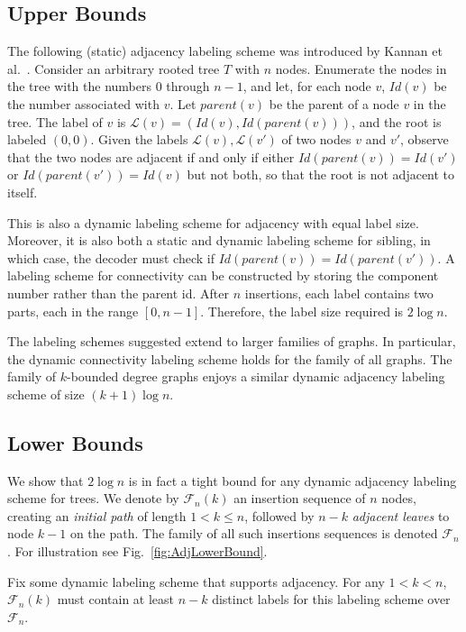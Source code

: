 \documentclass{llncs}
\newcommand{\la}{\ensuremath{ \mathcal{L}}}
\newcommand{\drop}[1]{}
\begin{document}
\subsection{ Upper Bounds} \label{sec:upper-bounds-dynamic}
The following (static) adjacency labeling scheme was introduced by Kannan et al.~\cite{Kannan92}.
Consider an arbitrary rooted tree $T$ with $n$ nodes.
Enumerate the nodes in the tree with the numbers $0$ through $n-1$, and let,
for each node $v$, $Id(v)$ be the number associated with $v$. Let $parent(v)$ be the parent of a node $v$ in the tree.
The label of $v$ is $\la(v) = (Id(v),Id(parent(v)))$, and the root is labeled
$(0,0)$. Given the labels $\la(v),\la(v')$ of two nodes $v$ and $v'$, observe
that the two nodes are adjacent if and only if either $Id(parent(v))=Id(v')$ or
$Id(parent(v'))=Id(v)$ but not both, so that the root is not adjacent to
itself.

This is also  a dynamic labeling scheme for adjacency with equal label size.
 Moreover, it is also both a static and dynamic labeling scheme for sibling,
in which case, the decoder must check if $Id(parent(v))= Id(parent(v'))$.
 A labeling scheme for connectivity can be constructed by storing the
 component number rather than the parent id. After $n$ insertions, each label contains two parts, each in the range
 $[0,n-1]$.  Therefore, the label size required is $2 \log n$.

The labeling schemes suggested extend to larger families of graphs.
In particular, the dynamic connectivity labeling scheme  holds  for the family of all graphs.
The family of $k$-bounded degree graphs enjoys a similar dynamic adjacency labeling scheme of size $(k+1) \log n$.



\subsection{ Lower Bounds}
We  show that $2 \log n$ is in fact a tight bound for any dynamic adjacency labeling scheme for trees.
We denote  by $\mathcal{F}_n(k)$ an  insertion sequence   of  $n$ nodes, creating  an \emph{initial  path} of length $1 < k \leq n $, followed by  $n-k$  \emph{adjacent leaves}  to node $k-1$ on the path.
The family of all such insertions sequences is denoted $\mathcal{F}_n$. For illustration see Fig.~\ref{fig:AdjLowerBound}.


\begin{lemma}\label{lem:pers-anc}
Fix some dynamic labeling scheme that supports adjacency. For any $1 < k < n$, $\mathcal{F}_n(k)$ must contain at least $n-k$ distinct labels \drop{wrt.} for this labeling scheme over $\mathcal{F}_n$.
\end{lemma}
\end{document}
